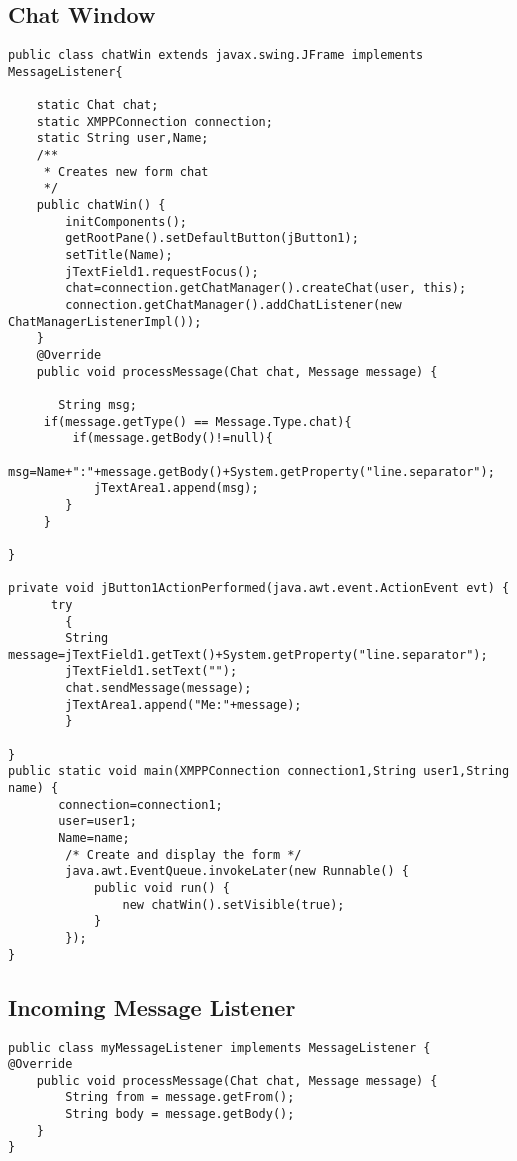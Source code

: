 \documentclass{SureshLimkar}
\begin{document}
\subsection{Chat Window}
\begin{lstlisting}
public class chatWin extends javax.swing.JFrame implements MessageListener{

    static Chat chat;
    static XMPPConnection connection;
    static String user,Name;
    /**
     * Creates new form chat
     */
    public chatWin() {
        initComponents();
        getRootPane().setDefaultButton(jButton1);
        setTitle(Name);
        jTextField1.requestFocus();
        chat=connection.getChatManager().createChat(user, this);
        connection.getChatManager().addChatListener(new ChatManagerListenerImpl());
    }
    @Override
    public void processMessage(Chat chat, Message message) {

       String msg;
	 if(message.getType() == Message.Type.chat){
         if(message.getBody()!=null){
        	msg=Name+":"+message.getBody()+System.getProperty("line.separator");
        	jTextArea1.append(msg);
       	}
     }
        
}
    
private void jButton1ActionPerformed(java.awt.event.ActionEvent evt) {
      try
        {
        String message=jTextField1.getText()+System.getProperty("line.separator");
        jTextField1.setText("");
        chat.sendMessage(message);
        jTextArea1.append("Me:"+message);
        }
       
}
public static void main(XMPPConnection connection1,String user1,String name) {
       connection=connection1;
       user=user1;
       Name=name;
        /* Create and display the form */
        java.awt.EventQueue.invokeLater(new Runnable() {
            public void run() {
                new chatWin().setVisible(true);
            }
        });
}
\end{lstlisting}


\newpage

\subsection{Incoming Message Listener}
\begin{lstlisting}
public class myMessageListener implements MessageListener {
@Override
	public void processMessage(Chat chat, Message message) {
    	String from = message.getFrom();
    	String body = message.getBody();
	}
}
\end{lstlisting}
\end{document}
